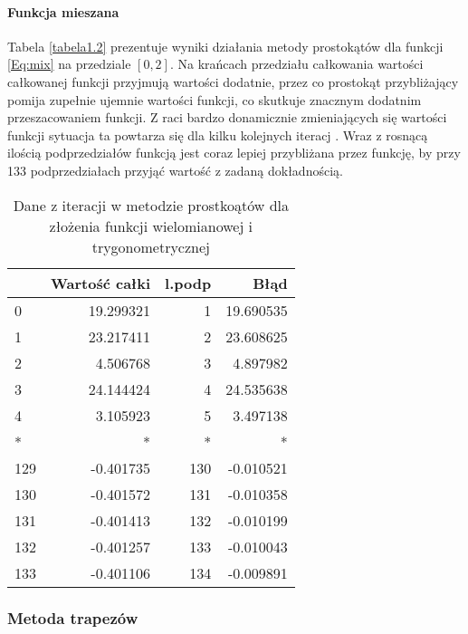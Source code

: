 \documentclass[12pt,twoside]{article}
\begin{document}
\paragraph{Funkcja mieszana}

Tabela \eqref{tabela1.2} prezentuje wyniki działania metody prostokątów dla funkcji \eqref{Eq:mix} na przedziale $[0,2]$.
Na krańcach przedziału całkowania wartości całkowanej funkcji przyjmują  wartości dodatnie, przez co prostokąt przybliżający pomija zupełnie ujemnie wartości funkcji, co skutkuje znacznym dodatnim przeszacowaniem funkcji. Z raci bardzo donamicznie zmieniających się wartości funkcji sytuacja ta powtarza się dla kilku kolejnych iteracj . Wraz z rosnącą ilością podprzedziałów funkcją jest coraz lepiej przybliżana przez funkcję, by przy 133 podprzedziałach przyjąć wartość z zadaną dokładnością.



\begin{table}[H]
\centering
\caption{Dane z iteracji w metodzie prostkoątów dla złożenia funkcji wielomianowej i trygonometrycznej}
\label{tabela1.3}
\begin{tabular}{lrrr}
\toprule
{} &  Wartość całki &  l.podp &       Błąd \\
\midrule
0   &      19.299321 &       1 &  19.690535 \\
1   &      23.217411 &       2 &  23.608625 \\
2   &       4.506768 &       3 &   4.897982 \\
3   &      24.144424 &       4 &  24.535638 \\
4   &       3.105923 &       5 &   3.497138 \\
*   &       * &       * &   * \\
129 &      -0.401735 &     130 &  -0.010521 \\
130 &      -0.401572 &     131 &  -0.010358 \\
131 &      -0.401413 &     132 &  -0.010199 \\
132 &      -0.401257 &     133 &  -0.010043 \\
133 &      -0.401106 &     134 &  -0.009891 \\
\bottomrule
\end{tabular}
\end{table}



\subsubsection{Metoda trapezów}
\end{document}
